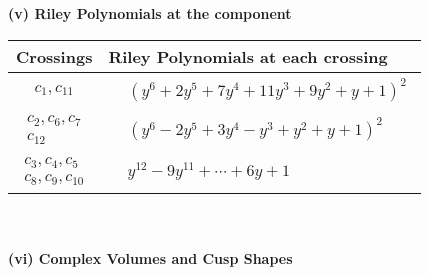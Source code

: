 \documentclass[1p]{elsarticle_modified}
\theoremstyle{definition}
\begin{document}
\newpage\renewcommand{\arraystretch}{1}
\flushleft \textbf{(v) Riley Polynomials at the component}\newline \\
\begin{tabular}{m{50pt}|m{274pt}}
Crossings & \hspace{64pt}Riley Polynomials at each crossing \\
\hline $$\begin{aligned}c_{1},c_{11}\end{aligned}$$&$\begin{aligned}
&(y^6+2 y^5+7 y^4+11 y^3+9 y^2+y+1)^2
\end{aligned}$\\
\hline $$\begin{aligned}c_{2},c_{6},c_{7}\\c_{12}\end{aligned}$$&$\begin{aligned}
&(y^6-2 y^5+3 y^4- y^3+y^2+y+1)^2
\end{aligned}$\\
\hline $$\begin{aligned}c_{3},c_{4},c_{5}\\c_{8},c_{9},c_{10}\end{aligned}$$&$\begin{aligned}
&y^{12}-9 y^{11}+\cdots+6 y+1
\end{aligned}$\\
\hline
\end{tabular}\\~\\
\newpage\flushleft \textbf{(vi) Complex Volumes and Cusp Shapes}
\end{document}
